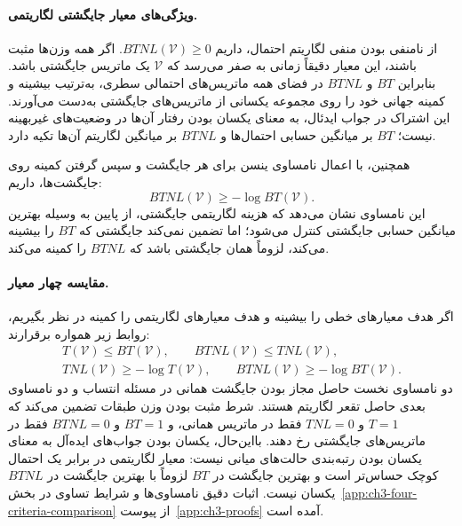 \paragraph{ویژگی‌های معیار جایگشتی لگاریتمی.}
از نامنفی بودن منفی لگاریتم احتمال، داریم $BTNL(\mathcal V)\ge0$. اگر همه وزن‌ها مثبت باشند، این معیار دقیقاً زمانی به صفر می‌رسد که $\mathcal V$ یک ماتریس جایگشتی باشد. بنابراین $BT$ و $BTNL$ در فضای همه ماتریس‌های احتمالی سطری، به‌ترتیب بیشینه و کمینه جهانی خود را روی مجموعه یکسانی از ماتریس‌های جایگشتی به‌دست می‌آورند. این اشتراک در جواب ایدئال، به معنای یکسان بودن رفتار آن‌ها در وضعیت‌های غیربهینه نیست؛ $BT$ بر میانگین حسابی احتمال‌ها و $BTNL$ بر میانگین لگاریتم آن‌ها تکیه دارد.

همچنین، با اعمال نامساوی ینسن برای هر جایگشت و سپس گرفتن کمینه روی جایگشت‌ها، داریم:
\begin{equation}\label{eq:ch3-BTNL-Jensen}
\boxed{
BTNL(\mathcal V)\ge-\log BT(\mathcal V).
}
\end{equation}
این نامساوی نشان می‌دهد که هزینه لگاریتمی جایگشتی، از پایین به وسیله بهترین میانگین حسابی جایگشتی کنترل می‌شود؛ اما تضمین نمی‌کند جایگشتی که $BT$ را بیشینه می‌کند، لزوماً همان جایگشتی باشد که $BTNL$ را کمینه می‌کند.

\paragraph{مقایسه چهار معیار.}
اگر هدف معیارهای خطی را بیشینه و هدف معیارهای لگاریتمی را کمینه در نظر بگیریم، روابط زیر همواره برقرارند:
\begin{equation}\label{eq:ch3-four-criteria-comparison}
\boxed{
\begin{gathered}
T(\mathcal V)\le BT(\mathcal V),\qquad
BTNL(\mathcal V)\le TNL(\mathcal V),\\
TNL(\mathcal V)\ge-\log T(\mathcal V),\qquad
BTNL(\mathcal V)\ge-\log BT(\mathcal V).
\end{gathered}}
\end{equation}
دو نامساوی نخست حاصل مجاز بودن جایگشت همانی در مسئله انتساب و دو نامساوی بعدی حاصل تقعر لگاریتم هستند. شرط مثبت بودن وزن طبقات تضمین می‌کند که $T=1$ و $TNL=0$ فقط در ماتریس همانی، و $BT=1$ و $BTNL=0$ فقط در ماتریس‌های جایگشتی رخ دهند. بااین‌حال، یکسان بودن جواب‌های ایده‌آل به معنای یکسان بودن رتبه‌بندی حالت‌های میانی نیست: معیار لگاریتمی در برابر یک احتمال کوچک حساس‌تر است و بهترین جایگشت در $BT$ لزوماً با بهترین جایگشت در $BTNL$ یکسان نیست. اثبات دقیق نامساوی‌ها و شرایط تساوی در بخش~\ref{app:ch3-four-criteria-comparison} از پیوست~\ref{app:ch3-proofs} آمده است.


